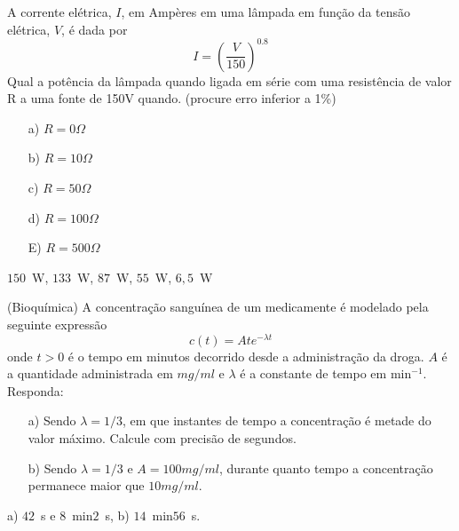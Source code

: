 \begin{Exercise}[title=Eletricidade]A corrente elétrica, $I$, em Ampères em uma lâmpada em função da tensão elétrica, $V$, é dada por
$$I=\left(\frac{V}{150}\right)^{0.8}$$
Qual a potência da lâmpada quando ligada em série com uma resistência de valor R a uma fonte de 150V quando. (procure erro inferior a 1\%)
\begin{itemize}
\item [a)] $R=0\Omega$
\item [b)] $R=10\Omega$
\item [c)] $R=50\Omega$
\item [d)] $R=100\Omega$
\item [E)] $R=500\Omega$
\end{itemize}
\end{Exercise}
\begin{Answer}
  \begin{tiny}
$150$~W, $133$~W, $87$~W, $55$~W, $6,5$~W    
  \end{tiny}
\end{Answer}




\begin{Exercise} (Bioquímica) A concentração sanguínea de um medicamente é modelado pela seguinte expressão
$$c(t)=Ate^{-\lambda t}$$
onde $t>0$ é o tempo em minutos decorrido desde a administração da droga. $A$ é a quantidade administrada em $mg/ml$ e $\lambda$ é a constante de tempo em min$^{-1}$.
Responda:
\begin{itemize}
\item[a)] Sendo $\lambda=1/3$, em que instantes de tempo a concentração é metade do valor máximo. Calcule com precisão de segundos.
\item[b)] Sendo $\lambda=1/3$ e $A=100mg/ml$, durante quanto tempo a concentração permanece maior que $10mg/ml$.
\end{itemize}
\end{Exercise}

\begin{Answer}
  \begin{tiny}
a) $42$~s e $8$~min$2$~s, b) $14$~min$56$~s.    
  \end{tiny}
\end{Answer}


